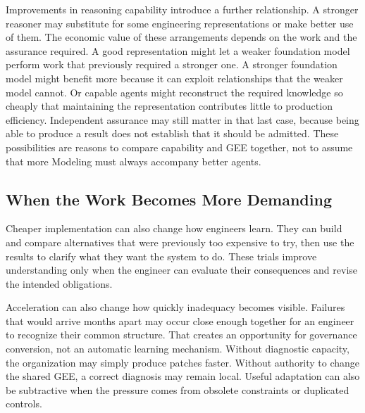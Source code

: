 
Improvements in reasoning capability introduce a further relationship. A stronger reasoner may substitute for some engineering representations or make better use of them. The economic value of these arrangements depends on the work and the assurance required. A good representation might let a weaker foundation model perform work that previously required a stronger one. A stronger foundation model might benefit more because it can exploit relationships that the weaker model cannot. Or capable agents might reconstruct the required knowledge so cheaply that maintaining the representation contributes little to production efficiency. Independent assurance may still matter in that last case, because being able to produce a result does not establish that it should be admitted. These possibilities are reasons to compare capability and GEE together, not to assume that more Modeling must always accompany better agents.

\subsection{When the Work Becomes More Demanding}\label{heading:when-the-work-becomes-more-demanding}


Cheaper implementation can also change how engineers learn. They can build and compare alternatives that were previously too expensive to try, then use the results to clarify what they want the system to do. These trials improve understanding only when the engineer can evaluate their consequences and revise the intended obligations.

Acceleration can also change how quickly inadequacy becomes visible. Failures that would arrive months apart may occur close enough together for an engineer to recognize their common structure. That creates an opportunity for governance conversion, not an automatic learning mechanism. Without diagnostic capacity, the organization may simply produce patches faster. Without authority to change the shared GEE, a correct diagnosis may remain local. Useful adaptation can also be subtractive when the pressure comes from obsolete constraints or duplicated controls.

